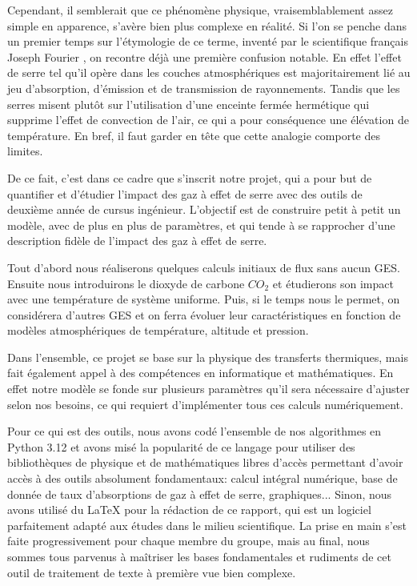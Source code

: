 \documentclass[a4paper, 12pt]{report} %
\begin{document}
\indent Cependant, il semblerait que ce phénomène physique, vraisemblablement assez simple 
en apparence, s'avère bien plus complexe en réalité. Si l'on se penche dans un premier temps sur 
l'étymologie de ce terme, inventé par le scientifique français Joseph Fourier
,
on recontre déjà une première confusion notable. En effet l'effet de serre 
tel qu'il opère dans les couches atmosphériques est majoritairement lié au jeu d'absorption, d'émission 
et de transmission de rayonnements. Tandis que les serres misent plutôt sur l'utilisation d'une enceinte 
fermée hermétique qui supprime l'effet de convection de l'air, ce qui a pour conséquence une élévation 
de température. En bref, il faut garder en tête que cette analogie comporte des limites. \vspace{\baselineskip}

\indent De ce fait, c'est dans ce cadre que s'inscrit notre projet, qui a pour but de quantifier et d'étudier
l'impact des gaz à effet de serre avec des outils de deuxième année de cursus ingénieur. L'objectif est 
de construire petit à petit un modèle, avec de plus en plus de paramètres, et qui tende à se rapprocher
d'une description fidèle de l'impact des gaz à effet de serre. \vspace{\baselineskip}

\indent Tout d'abord nous réaliserons quelques calculs initiaux de flux sans aucun GES.
Ensuite nous introduirons le dioxyde de carbone $CO_2$ et étudierons son impact avec une température de
système uniforme. Puis, si le temps nous le permet, on considérera d'autres GES et on ferra évoluer leur caractéristiques
en fonction de modèles atmosphériques de température, altitude et pression. \vspace{\baselineskip}

\indent Dans l'ensemble, ce projet se base sur la physique des transferts thermiques, 
mais fait également appel à des compétences en informatique et mathématiques.
En effet notre modèle se fonde sur plusieurs paramètres qu'il sera nécessaire
d'ajuster selon nos besoins, ce qui requiert d'implémenter tous ces calculs
numériquement. \vspace{\baselineskip}

\indent Pour ce qui est des outils, nous avons codé l'ensemble de nos algorithmes en Python 3.12 et avons misé
la popularité de ce langage pour utiliser des bibliothèques de physique et de mathématiques libres d'accès
permettant d'avoir accès à des outils absolument fondamentaux: calcul intégral numérique, 
base de donnée de taux d'absorptions de gaz à effet de serre, graphiques... Sinon, nous avons utilisé du \LaTeX
pour la rédaction de ce rapport, qui est un logiciel parfaitement adapté aux études dans le milieu scientifique.
La prise en main s'est faite progressivement pour chaque membre du groupe, mais au final, nous sommes tous parvenus
à maîtriser les bases fondamentales et rudiments de cet outil de traitement de texte à première vue bien complexe.
\end{document}
